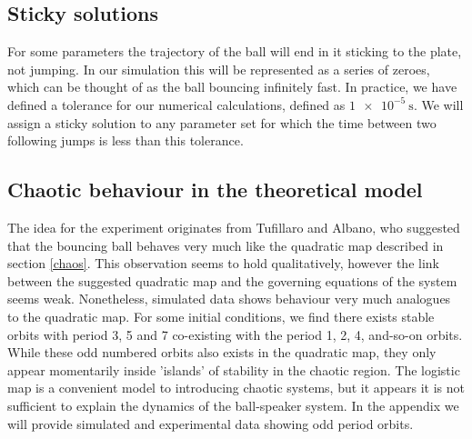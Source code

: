 \documentclass[12pt,oneside,a4paper]{article}
\numberwithin{equation}{section}
\begin{document}
{{{{\subsection{Sticky solutions}
For some parameters the trajectory of the ball will end in it sticking to the plate, not jumping. In our simulation this will be represented as a series of zeroes, which can be thought of as the ball bouncing infinitely fast. In practice, we have defined a tolerance for our numerical calculations, defined as $\SI{1e-5}{\second}$. We will assign a sticky solution to any parameter set for which the time between two following jumps is less than this tolerance. 
\subsection{Chaotic behaviour in the theoretical model}
The idea for the experiment originates from Tufillaro and Albano\cite{tufillaro}, who suggested that the bouncing ball behaves very much like the quadratic map described in section \ref{chaos}. This observation seems to hold qualitatively, however the link between the suggested quadratic map and the governing equations of the system seems weak. Nonetheless, simulated data shows behaviour very much analogues to the quadratic map. For some initial conditions, we find there exists stable orbits with period 3, 5 and 7 co-existing with the period 1, 2, 4, and-so-on orbits. While these odd numbered orbits also exists in the quadratic map, they only appear momentarily inside 'islands' of stability in the chaotic region. The logistic map is a convenient model to introducing chaotic systems, but it appears it is not sufficient to explain the dynamics of the ball-speaker system. In the appendix we will provide simulated and experimental data showing odd period orbits.  
}}}}
\end{document}
